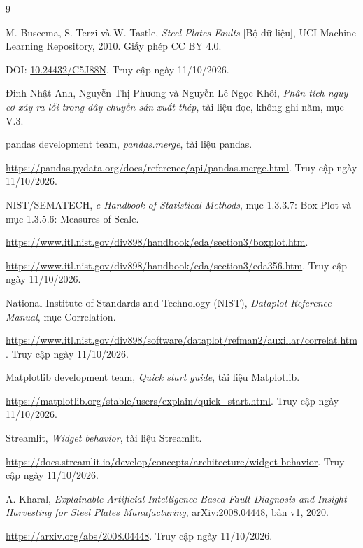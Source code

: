 \clearpage
\renewcommand{\bibname}{Tài liệu tham khảo}
\begin{thebibliography}{9}

  M. Buscema, S. Terzi và W. Tastle,
  \textit{Steel Plates Faults} [Bộ dữ liệu],
  UCI Machine Learning Repository, 2010.
  Giấy phép CC BY 4.0.
  \par\noindent
  DOI: \href{https://doi.org/10.24432/C5J88N}{10.24432/C5J88N}.
  Truy cập ngày 11/10/2026.

  Đinh Nhật Anh, Nguyễn Thị Phương và Nguyễn Lê Ngọc Khôi,
  \textit{Phân tích nguy cơ xảy ra lỗi trong dây chuyền sản xuất thép},
  tài liệu đọc, không ghi năm, mục V.3.

  pandas development team,
  \textit{pandas.merge}, tài liệu pandas.
  \par\noindent
  \url{https://pandas.pydata.org/docs/reference/api/pandas.merge.html}.
  Truy cập ngày 11/10/2026.

  NIST/SEMATECH,
  \textit{e-Handbook of Statistical Methods},
  mục 1.3.3.7: Box Plot và mục 1.3.5.6: Measures of Scale.
  \par\noindent
  \url{https://www.itl.nist.gov/div898/handbook/eda/section3/boxplot.htm}.
  \par\noindent
  \url{https://www.itl.nist.gov/div898/handbook/eda/section3/eda356.htm}.
  Truy cập ngày 11/10/2026.

  National Institute of Standards and Technology (NIST),
  \textit{Dataplot Reference Manual}, mục Correlation.
  \par\noindent
  \url{https://www.itl.nist.gov/div898/software/dataplot/refman2/auxillar/correlat.htm}.
  Truy cập ngày 11/10/2026.

  Matplotlib development team,
  \textit{Quick start guide}, tài liệu Matplotlib.
  \par\noindent
  \url{https://matplotlib.org/stable/users/explain/quick_start.html}.
  Truy cập ngày 11/10/2026.

  Streamlit,
  \textit{Widget behavior}, tài liệu Streamlit.
  \par\noindent
  \url{https://docs.streamlit.io/develop/concepts/architecture/widget-behavior}.\space
  Truy cập ngày 11/10/2026.

  A. Kharal,
  \textit{Explainable Artificial Intelligence Based Fault Diagnosis and Insight Harvesting for Steel Plates Manufacturing},
  arXiv:2008.04448, bản v1, 2020.
  \par\noindent
  \url{https://arxiv.org/abs/2008.04448}.
  Truy cập ngày 11/10/2026.
\end{thebibliography}
